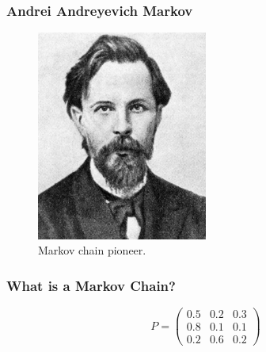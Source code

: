 \documentclass{beamer}
\begin{document}
\begin{frame}
\frametitle{Andrei Andreyevich Markov}
\begin{figure}
  \includegraphics[width=0.5\textwidth]{andreimarkovmathematician}
  \caption{Markov chain pioneer.}
\end{figure}
\end{frame}



\begin{frame}
\frametitle{What is a Markov Chain?}
\begin{figure}
  
\end{figure}
\end{frame}



\begin{frame}
\huge{
\begin{equation*}
 P =  \left( \begin{array}{ccc}
0.5 & 0.2 & 0.3 \\
0.8 & 0.1 & 0.1 \\
0.2 & 0.6 & 0.2 \end{array} \right)
\end{equation*}
}
\end{frame}



\begin{frame}
\begin{figure}
\end{figure}
\end{frame}
\end{document}
